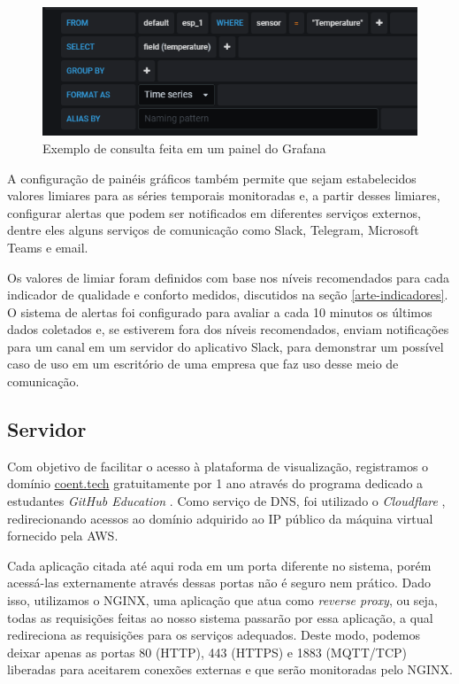 \documentclass[../monografia.tex]{subfiles}
\begin{document}
\begin{figure}[h!]
	\centering
	\includegraphics[scale=0.7]{grafana-graph-query.png}
	\caption{Exemplo de consulta feita em um painel do Grafana}
	\label{fig:grafana-query}
\end{figure}


A configuração de painéis gráficos também permite que sejam estabelecidos valores limiares para as séries temporais monitoradas e, a partir desses limiares, configurar alertas que podem ser notificados em diferentes serviços externos, dentre eles alguns serviços de comunicação como Slack, Telegram, Microsoft Teams e email. 

Os valores de limiar foram definidos com base nos níveis recomendados para cada indicador de qualidade e conforto medidos, discutidos na seção \ref{arte-indicadores}. O sistema de alertas foi configurado para avaliar a cada 10 minutos os últimos dados coletados e, se estiverem fora dos níveis recomendados, enviam notificações para um canal em um servidor do aplicativo Slack, para demonstrar um possível caso de uso em um escritório de uma empresa que faz uso desse meio de comunicação.



\subsection{Servidor}

Com objetivo de facilitar o acesso à plataforma de visualização, registramos o domínio \underline{coent.tech} gratuitamente por 1 ano através do programa dedicado a estudantes \textit{GitHub Education} \cite{github-education}. Como serviço de DNS, foi utilizado o \textit{Cloudflare} \cite{cloudflare}, redirecionando acessos ao domínio adquirido ao IP público da máquina virtual fornecido pela AWS.

Cada aplicação citada até aqui roda em um porta diferente no sistema, porém acessá-las externamente através dessas portas não é seguro nem prático. Dado isso, utilizamos o NGINX, uma aplicação que atua como \textit{reverse proxy}, ou seja, todas as requisições feitas ao nosso sistema passarão por essa aplicação, a qual redireciona as requisições para os serviços adequados. Deste modo, podemos deixar apenas as portas 80 (HTTP), 443 (HTTPS) e 1883 (MQTT/TCP) liberadas para aceitarem conexões externas e que serão monitoradas pelo NGINX.
\end{document}
